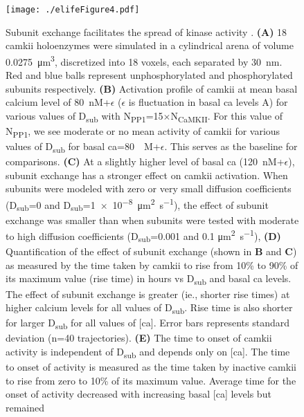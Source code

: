 \documentclass[9pt,lineno,doublespacing]{elife}
\newcommand\SUB[2]{#1\textsubscript{#2}}
\begin{document}
\begin{figure}
    \texttt{[image: ./elifeFigure4.pdf]}
    \caption{Subunit exchange facilitates the spread of kinase activity
        \citep{stratton_activation-triggered_2014}. \textbf{(A)} 18 \gls{camkii}
        holoenzymes were simulated in a cylindrical arena of volume
        \SI{0.0275}{\cubic\micro\meter}, discretized into 18 voxels, each
        separated by \SI{30}{\nano\meter}. Red and blue balls represent
        unphosphorylated and phosphorylated subunits respectively.
        \textbf{(B)} Activation profile of \gls{camkii} at mean basal calcium
        level of \SI{80}{\nano M}+$\epsilon$ ($\epsilon$ is fluctuation in basal
        \gls{ca} levels A) for various values of \SUB{D}{sub}
        with \SUB{N}{PP1}=15$\times$\SUB{N}{CaMKII}. For this value of
        \SUB{N}{PP1}, we see moderate or no mean activity of \gls{camkii} for
        various values of \SUB{D}{sub} for basal \gls{ca}=\SI{80}{\nano
        M}+$\epsilon$. This serves as the baseline for comparisons.
        \textbf{(C)} At a slightly higher level of basal \gls{ca}
        (\SI{120}{\nano M}+$\epsilon$), subunit exchange has a stronger effect
        on \gls{camkii} activation. When subunits were modeled with zero or very
        small diffusion coefficients (\SUB{D}{sub}=0 and
        \SUB{D}{sub}=\SI{1e-8}{\micro\meter\squared\per\second}), the effect of
        subunit exchange was smaller than when subunits were tested with
        moderate to high diffusion coefficients (\SUB{D}{sub}=0.001 and 0.1
        \si{\micro\meter\squared\per\second}), 
        \textbf{(D)} Quantification of the effect of subunit exchange (shown in
        \textbf{B} and \textbf{C}) as measured by the time taken by
        \gls{camkii} to rise from 10\% to 90\% of its maximum
        value (rise time) in hours vs \SUB{D}{sub} and basal \gls{ca} levels. 
        The effect of subunit exchange is greater (ie., shorter rise times) 
        at higher calcium levels for all values of
        \SUB{D}{sub}. Rise time is also shorter for larger \SUB{D}{sub} for all
        values of [\gls{ca}]. Error bars represents standard deviation (n=40
        trajectories).
        \textbf{(E)} The time to onset of \gls{camkii} activity is independent
        of \SUB{D}{sub} and depends only on [\gls{ca}]. The time to onset of
        activity is measured as the time taken by inactive \gls{camkii} to rise
        from zero to 10\% of its maximum value. Average time for the onset of
        activity decreased with increasing basal [\gls{ca}] levels but remained
}
\end{figure}
\end{document}

